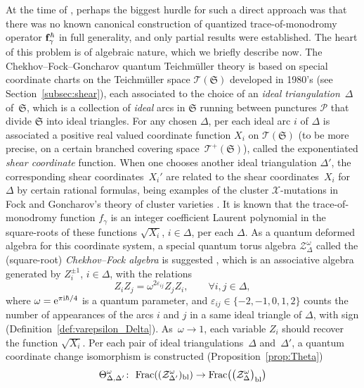 \documentclass[pdftex]{sigma}
\numberwithin{equation}{section}
\theoremstyle{definition}
\begin{document}
At the time of \cite{F97, CF, FG09}, perhaps the biggest hurdle for such a direct approach was that there was no known canonical construction of quantized trace-of-monodromy operator ${\bf f}^\hbar_\gamma$ in full generality, and only partial results were established. The heart of this problem is of algebraic nature, which we briefly describe now. The Chekhov--Fock--Goncharov quantum Teichm\"uller theory is based on special coordinate charts on the Teichm\"uller space $\mathscr{T}(\mathfrak{S})$ developed in 1980's \cite{F93,F97,P12, Thurston, Thurston86} (see Section~\ref{subsec:shear}), each associated to the choice of an {\em ideal triangulation}~$\Delta$ of~$\mathfrak{S}$, which is a collection of {\em ideal} arcs in $\mathfrak{S}$ running between punctures $\mathcal{P}$ that divide $\mathfrak{S}$ into ideal triangles. For any chosen $\Delta$, per each ideal arc $i$ of $\Delta$ is associated a positive real valued coordinate function $X_i$ on $\mathscr{T}(\mathfrak{S})$ (to be more precise, on a certain branched covering space~$\mathscr{T}^+(\mathfrak{S})$), called the exponentiated {\em shear coordinate} function. When one chooses another ideal triangulation $\Delta'$, the corresponding shear coordinates~$X_i'$ are related to the shear coordinates~$X_i$ for~$\Delta$ by certain rational formulas, being examples of the cluster $\mathscr{X}$-mutations in Fock and Goncharov's theory of cluster varieties \cite{F97, FG06, FG09}. It is known that the trace-of-monodromy function $f_\gamma$ is an integer coefficient Laurent polynomial in the square-roots of these functions $\sqrt{X_i}$, $i\in \Delta$, per each $\Delta$. As a quantum deformed algebra for this coordinate system, a special quantum torus algebra $\mathcal{Z}^\omega_\Delta$ called the (square-root) {\it Chekhov--Fock algebra} is suggested \cite{BL07, BW, FG09, Hiatt, Liu}, which is an associative algebra generated by $Z_i^{\pm 1}$, $i \in \Delta$, with the relations
\[
Z_i Z_j = \omega^{2\varepsilon_{ij}} Z_j Z_i, \qquad \forall i, j \in \Delta,
\]
where $\omega = {\rm e}^{\pi {\rm i} \hbar/4}$ is a quantum parameter, and $\varepsilon_{ij} \in \{-2,-1,0,1,2\}$ counts the number of appearances of the arcs $i$ and $j$ in a same ideal triangle of $\Delta$, with sign (Definition~\ref{def:varepsilon_Delta}). As~$\omega\to1$, each variable $Z_i$ should recover the function $\sqrt{X_i}$. Per each pair of ideal triangulations~$\Delta$ and~$\Delta'$, a quantum coordinate change isomorphism is constructed (Proposition~\ref{prop:Theta})
\[
\Theta^\omega_{\Delta,\Delta'} \colon \ {\rm Frac}( (\mathcal{Z}^\omega_{\Delta'})_{\rm bl} ) \to {\rm Frac}\bigl( \bigl(\mathcal{Z}^\omega_\Delta\bigr)_{\rm bl}\bigr)
\]
\end{document}
